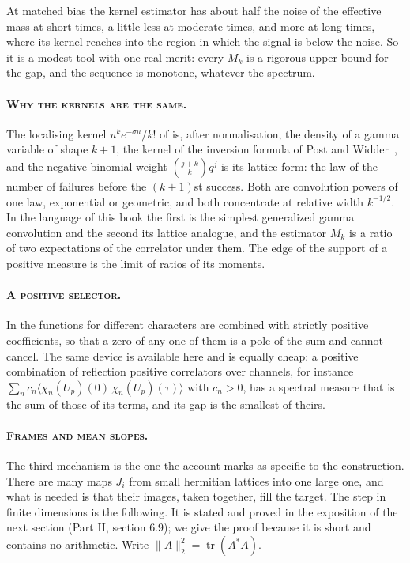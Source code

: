At matched bias the kernel estimator has about half the noise of the effective mass at short times, a little less at moderate times, and more at long times, where its kernel reaches into the region in which the signal is below the noise. So it is a modest tool with one real merit: every $M_k$ is a rigorous upper bound for the gap, and the sequence is monotone, whatever the spectrum.

\paragraph{\normalfont\scshape Why the kernels are the same.} The localising kernel $u^ke^{-\sigma u}/k!$ of \cite{DLCL} is, after normalisation, the density of a gamma variable of shape $k+1$, the kernel of the inversion formula of Post and Widder~\cite{Pt30,Wi41}, and the negative binomial weight $\binom{j+k}{k}q^j$ is its lattice form: the law of the number of failures before the $(k+1)$st success. Both are convolution powers of one law, exponential or geometric, and both concentrate at relative width $k^{-1/2}$. In the language of this book the first is the simplest generalized gamma convolution and the second its lattice analogue, and the estimator $M_k$ is a ratio of two expectations of the correlator under them. The edge of the support of a positive measure is the limit of ratios of its moments.

\paragraph{\normalfont\scshape A positive selector.} In \cite{DLCL} the functions for different characters are combined with strictly positive coefficients, so that a zero of any one of them is a pole of the sum and cannot cancel. The same device is available here and is equally cheap: a positive combination of reflection positive correlators over channels, for instance $\sum_nc_n\langle\chi_n(U_p)(0)\,\chi_n(U_p)(\tau)\rangle$ with $c_n>0$, has a spectral measure that is the sum of those of its terms, and its gap is the smallest of theirs.

\paragraph{\normalfont\scshape Frames and mean slopes.} The third mechanism is the one the account marks as specific to the construction. There are many maps $J_i$ from small hermitian lattices into one large one, and what is needed is that their images, taken together, fill the target. The step in finite dimensions is the following. It is stated and proved in the exposition \cite{Rub26} of the next section (Part II, section 6.9); we give the proof because it is short and contains no arithmetic. Write $\|A\|_2^2=\operatorname{tr}(A^*A)$.

